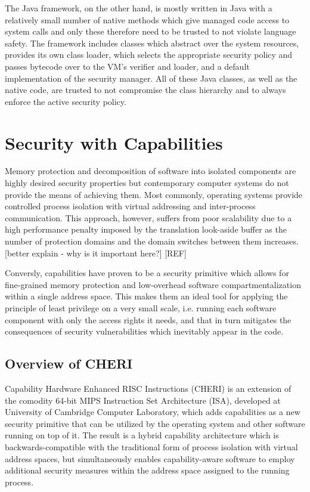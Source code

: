 \documentclass[a4paper,12pt,twoside,openright]{report}
\begin{document}
The Java framework, on the other hand, is mostly written in Java with a relatively small number of native methods which give managed code access to system calls and only these therefore need to be trusted to not violate language safety. The framework includes classes which abstract over the system resources, provides its own class loader, which selects the appropriate security policy and passes bytecode over to the VM's verifier and loader, and a default implementation of the security manager. All of these Java classes, as well as the native code, are trusted to not compromise the class hierarchy and to always enforce the active security policy.

\section{Security with Capabilities}

Memory protection and decomposition of software into isolated components are highly desired security properties but contemporary computer systems do not provide the means of achieving them. Most commonly, operating systems provide controlled process isolation with virtual addressing and inter-process communication. This approach, however, suffers from poor scalability due to a high performance penalty imposed by the translation look-aside buffer as the number of protection domains and the domain switches between them increases. [better explain - why is it important here?] [REF] 

Conversly, capabilities have proven to be a security primitive which allows for fine-grained memory protection and low-overhead software compartmentalization within a single address space. This makes them an ideal tool for applying the principle of least privilege on a very small scale, i.e. running each software component with only the access rights it needs, and that in turn mitigates the consequences of security vulnerabilities which inevitably appear in the code. 

\subsection{Overview of CHERI}

Capability Hardware Enhanced RISC Instructions (CHERI) is an extension of the comodity 64-bit MIPS Instruction Set Architecture (ISA), developed at University of Cambridge Computer Laboratory, which adds capabilities as a new security primitive that can be utilized by the operating system and other software running on top of it. The result is a hybrid capability architecture which is backwards-compatible with the traditional form of process isolation with virtual address spaces, but simultaneously enables capability-aware software to employ additional security measures within the address space assigned to the running process.
\end{document}
